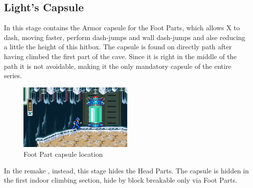 \subsection{Light's Capsule}\label{X:Foot_Parts}
In \x this stage contains the Armor capsule for the Foot Parts, which allows X to dash, moving faster, perform dash-jumps and wall dash-jumps and alse reducing a little the height of this hitbox. The capsule is found on directly path after having climbed the first part of the cave. Since it is right in the middle of the path it is not avoidable, making it the only mandatory capsule of the entire series.
\begin{figure}[htp]
	\centering
	\includegraphics[width=0.5\textwidth]{figures/X1/Chill_penguin/Armor_foot.jpg}
	\caption{Foot Part capsule location}
\end{figure}

In the remake \mhx, instead, this stage hides the Head Parts. The capsule is hidden in the first indoor climbing section, hide by block breakable only via Foot Parts.
